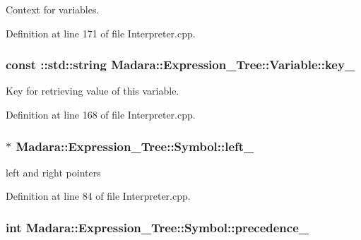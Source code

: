 Context for variables. 



Definition at line 171 of file Interpreter.cpp.

\hypertarget{classMadara_1_1Expression__Tree_1_1Variable_aa1a24281fc8deb28411580346595325c}{
\subsubsection[{key\_\-}]{\setlength{\rightskip}{0pt plus 5cm}const ::std::string {\bf Madara::Expression\_\-Tree::Variable::key\_\-}}}
\label{d8/d80/classMadara_1_1Expression__Tree_1_1Variable_aa1a24281fc8deb28411580346595325c}


Key for retrieving value of this variable. 



Definition at line 168 of file Interpreter.cpp.

\hypertarget{classMadara_1_1Expression__Tree_1_1Symbol_a7808eb3daad675e2e01409f173a41cee}{
\subsubsection[{left\_\-}]{$\ast$ {\bf Madara::Expression\_\-Tree::Symbol::left\_\-}}}
\label{d5/d85/classMadara_1_1Expression__Tree_1_1Symbol_a7808eb3daad675e2e01409f173a41cee}


left and right pointers 



Definition at line 84 of file Interpreter.cpp.

\hypertarget{classMadara_1_1Expression__Tree_1_1Symbol_a2de31139261eea47dccd48d377780803}{
\subsubsection[{precedence\_\-}]{\setlength{\rightskip}{0pt plus 5cm}int {\bf Madara::Expression\_\-Tree::Symbol::precedence\_\-}}}
\label{d5/d85/classMadara_1_1Expression__Tree_1_1Symbol_a2de31139261eea47dccd48d377780803}


